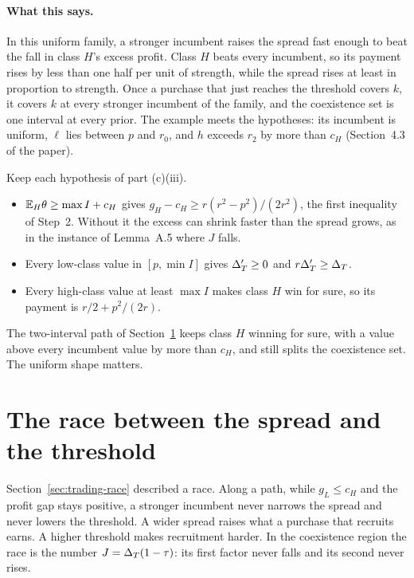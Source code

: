 \paragraph{What this says.} In this uniform family, a stronger incumbent raises the spread fast enough to beat the
fall in class \(H\)'s excess profit. Class \(H\) beats every incumbent, so its payment rises by less than one half
per unit of strength, while the spread rises at least in proportion to strength. Once a purchase that just reaches the
threshold covers \(k\), it covers \(k\) at every stronger incumbent of the family, and the coexistence set is one
interval at every prior. The example meets the hypotheses: its incumbent is uniform, \(\ell\) lies between \(p\) and
\(r_0\), and \(h\) exceeds \(r_2\) by more than \(c_H\) (Section~4.3 of the paper).

\begin{watchout}
Keep each hypothesis of part (c)(iii).
\begin{itemize}
\item \(\mathbb{E}_H\theta\ge\max I+c_H\) gives \(g_H-c_H\ge r(r^2-p^2)/(2r^2)\), the first inequality of Step~2. Without it the
excess can shrink faster than the spread grows, as in the instance of Lemma~A.5 where \(J\) falls.
\item Every low-class value in \([p,\min I]\) gives \(\Delta_T'\ge0\) and \(r\Delta_T'\ge\Delta_T\).
\item Every high-class value at least \(\max I\) makes class \(H\) win for sure, so its payment is
\(r/2+p^2/(2r)\).
\end{itemize}
The two-interval path of Section~\ref{sec:coexistence-race} keeps class \(H\) winning for sure, with a value above
every incumbent value by more than \(c_H\), and still splits the coexistence set. The uniform shape matters.
\end{watchout}

\section{The race between the spread and the threshold}\label{sec:coexistence-race}

Section~\ref{sec:trading-race} described a race. Along a path, while \(g_L\le c_H\) and the profit gap stays
positive, a stronger incumbent never narrows the spread and never lowers the threshold. A wider spread raises what a
purchase that recruits earns. A higher threshold makes recruitment harder. In the coexistence region the race is the
number \(J=\Delta_T(1-\tau)\): its first factor never falls and its second never rises.

